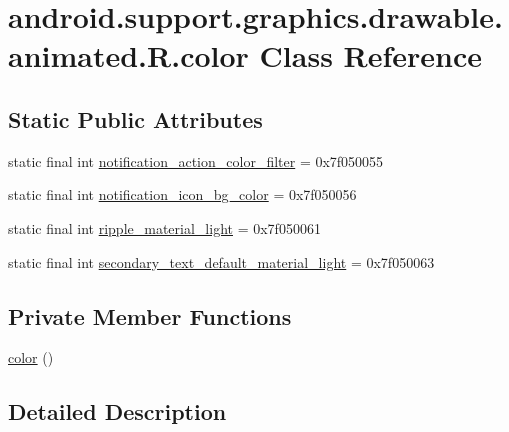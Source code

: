\hypertarget{classandroid_1_1support_1_1graphics_1_1drawable_1_1animated_1_1_r_1_1color}{}\section{android.\+support.\+graphics.\+drawable.\+animated.\+R.\+color Class Reference}
\label{classandroid_1_1support_1_1graphics_1_1drawable_1_1animated_1_1_r_1_1color}
\subsection*{Static Public Attributes}
\begin{DoxyCompactItemize}
\item 
static final int \mbox{\hyperlink{classandroid_1_1support_1_1graphics_1_1drawable_1_1animated_1_1_r_1_1color_a7eb2572a53f41b68420968c7753166b2}{notification\+\_\+action\+\_\+color\+\_\+filter}} = 0x7f050055
\item 
static final int \mbox{\hyperlink{classandroid_1_1support_1_1graphics_1_1drawable_1_1animated_1_1_r_1_1color_ac42fd8da7e38496255aa78facac71060}{notification\+\_\+icon\+\_\+bg\+\_\+color}} = 0x7f050056
\item 
static final int \mbox{\hyperlink{classandroid_1_1support_1_1graphics_1_1drawable_1_1animated_1_1_r_1_1color_a140821658e27ded4fbb22ed969645636}{ripple\+\_\+material\+\_\+light}} = 0x7f050061
\item 
static final int \mbox{\hyperlink{classandroid_1_1support_1_1graphics_1_1drawable_1_1animated_1_1_r_1_1color_aaabd20902a0ff6aa59bf6aca1a7a6751}{secondary\+\_\+text\+\_\+default\+\_\+material\+\_\+light}} = 0x7f050063
\end{DoxyCompactItemize}
\subsection*{Private Member Functions}
\begin{DoxyCompactItemize}
\item 
\mbox{\hyperlink{classandroid_1_1support_1_1graphics_1_1drawable_1_1animated_1_1_r_1_1color_ab3c54aa081397c74ba001771d535c116}{color}} ()
\end{DoxyCompactItemize}


\subsection{Detailed Description}


